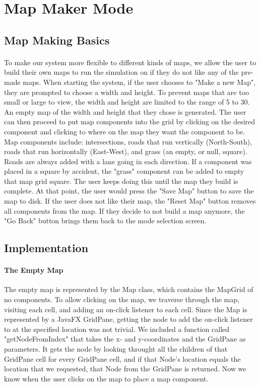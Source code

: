 \documentclass[a4paper,11pt,titlepage]{article}
\begin{document}
\section{Map Maker Mode}
\subsection{Map Making Basics}
\paragraph{}
To make our system more flexible to different kinds of maps, we allow the user to build their own maps to run the simulation on if they do not like any of the pre-made maps. When starting the system, if the user chooses to "Make a new Map", they are prompted to choose a width and height. To prevent maps that are too small or large to view, the width and height are limited to the range of 5 to 30. An empty map of the width and height that they chose is generated. The user can then proceed to put map components into the grid by clicking on the desired component and clicking to where on the map they want the component to be. Map components include: intersections, roads that run vertically (North-South), roads that run horizontally (East-West), and grass (an empty, or null, square). Roads are always added with a lane going in each direction. If a component was placed in a square by accident, the "grass" component can be added to empty that map grid square. The user keeps doing this until the map they build is complete. At that point, the user would press the "Save Map" button to save the map to disk. If the user does not like their map, the "Reset Map" button removes all components from the map. If they decide to not build a map anymore, the "Go Back" button brings them back to the mode selection screen. 

\subsection{Implementation}
\paragraph{The Empty Map}
The empty map is represented by the Map class, which contains the MapGrid of no components. To allow clicking on the map, we traverse through the map, visiting each cell, and adding an on-click listener to each cell. Since the Map is represented by a JavaFX GridPane, getting the node to add the on-click listener to at the specified location was not trivial. We included a function called "getNodeFromIndex" that takes the x- and y-coordinates and the GridPane as parameters. It gets the node by looking throught all the children of that GridPane cell for every GridPane cell, and if that Node's location equals the location that we requested, that Node from the GridPane is returned. Now we know when the user clicks on the map to place a map component.
\end{document}
